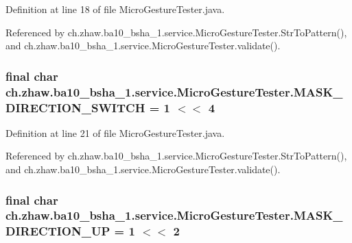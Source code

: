 Definition at line 18 of file MicroGestureTester.java.

Referenced by ch.zhaw.ba10\_\-bsha\_\-1.service.MicroGestureTester.StrToPattern(), and ch.zhaw.ba10\_\-bsha\_\-1.service.MicroGestureTester.validate().\hypertarget{classch_1_1zhaw_1_1ba10__bsha__1_1_1service_1_1MicroGestureTester_aeca290bcd16eecee3b90f5b02f1cdd8f}{
\subsubsection[{MASK\_\-DIRECTION\_\-SWITCH}]{\setlength{\rightskip}{0pt plus 5cm}final char {\bf ch.zhaw.ba10\_\-bsha\_\-1.service.MicroGestureTester.MASK\_\-DIRECTION\_\-SWITCH} = 1 $<$$<$ 4}}
\label{classch_1_1zhaw_1_1ba10__bsha__1_1_1service_1_1MicroGestureTester_aeca290bcd16eecee3b90f5b02f1cdd8f}


Definition at line 21 of file MicroGestureTester.java.

Referenced by ch.zhaw.ba10\_\-bsha\_\-1.service.MicroGestureTester.StrToPattern(), and ch.zhaw.ba10\_\-bsha\_\-1.service.MicroGestureTester.validate().\hypertarget{classch_1_1zhaw_1_1ba10__bsha__1_1_1service_1_1MicroGestureTester_a25a88ac488549097f1dc30228094d8c6}{
\subsubsection[{MASK\_\-DIRECTION\_\-UP}]{\setlength{\rightskip}{0pt plus 5cm}final char {\bf ch.zhaw.ba10\_\-bsha\_\-1.service.MicroGestureTester.MASK\_\-DIRECTION\_\-UP} = 1 $<$$<$ 2}}
\label{classch_1_1zhaw_1_1ba10__bsha__1_1_1service_1_1MicroGestureTester_a25a88ac488549097f1dc30228094d8c6}



